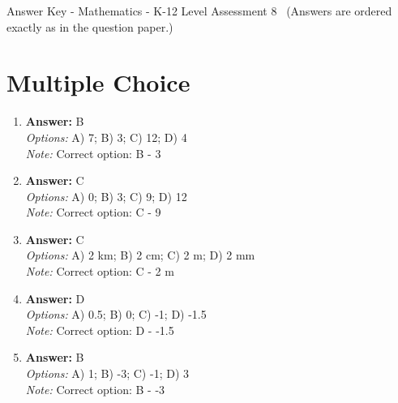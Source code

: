 \documentclass[12pt]{article}
\begin{document}
\begin{center}
Answer Key - Mathematics - K-12 Level Assessment 8 \
\small (Answers are ordered exactly as in the question paper.)
\end{center}

\section*{Multiple Choice}
\begin{enumerate}[label=\arabic*.]
\item \textbf{Answer:} B
\\ \textit{Options:} A) 7; B) 3; C) 12; D) 4
\\ \textit{Note:} Correct option: B - 3
\item \textbf{Answer:} C
\\ \textit{Options:} A) 0; B) 3; C) 9; D) 12
\\ \textit{Note:} Correct option: C - 9
\item \textbf{Answer:} C
\\ \textit{Options:} A) 2 km; B) 2 cm; C) 2 m; D) 2 mm
\\ \textit{Note:} Correct option: C - 2 m
\item \textbf{Answer:} D
\\ \textit{Options:} A) 0.5; B) 0; C) -1; D) -1.5
\\ \textit{Note:} Correct option: D - -1.5
\item \textbf{Answer:} B
\\ \textit{Options:} A) 1; B) -3; C) -1; D) 3
\\ \textit{Note:} Correct option: B - -3
\end{enumerate}
\end{document}
